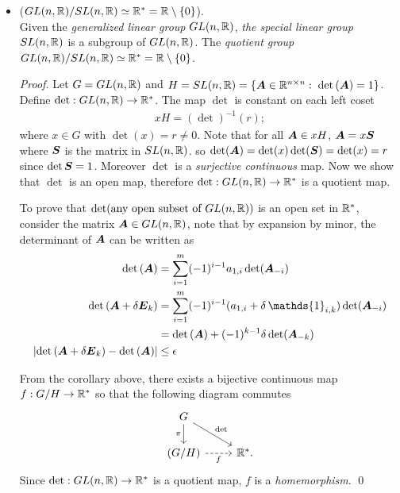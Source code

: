 \documentclass[11pt]{article}
\begin{document}
\begin{itemize}
\item \begin{example} ($GL(n, {\mathbb R})/SL(n, {\mathbb R}) \simeq {\mathbb R}^{*} = {\mathbb R} \setminus \left\{0\right\}$).\\
Given the \emph{generalized linear group} $GL(n, {\mathbb R})$, \emph{the special linear group} $SL(n, {\mathbb R})$ is a subgroup of $GL(n, {\mathbb R})$. The \emph{quotient group} $GL(n, {\mathbb R})/SL(n, {\mathbb R}) \simeq {\mathbb R}^{*} = {\mathbb R} \setminus \left\{0\right\}$.
\end{example}
\begin{proof}
Let $G = GL(n, {\mathbb R})$ and $H = SL(n, {\mathbb R}) = \left\{\boldsymbol{A}\in {\mathbb R}^{n\times n}:\; \det\left(\boldsymbol{A}\right)= 1\right\}$.  Define $\det: GL(n, {\mathbb R}) \rightarrow {\mathbb R}^{*}$. The map $\det$ is constant on each left coset 
\begin{align*}
xH = (\det{})^{-1}(r);
\end{align*} where $x \in G$ with $\det(x) = r \neq 0$. Note that for all $\boldsymbol{A} \in xH$, $\boldsymbol{A} = x\boldsymbol{S}$ where $\boldsymbol{S}$ is the matrix in $SL(n, {\mathbb R})$. so $\det(\boldsymbol{A}) = \det(x)\det(\boldsymbol{S}) = \det(x) = r$ since $\det{\boldsymbol{S}} = 1$.  Moreover $\det$ is a \emph{surjective continuous} map. Now we show that $\det$ is an open map, therefore $\det: GL(n, {\mathbb R}) \rightarrow {\mathbb R}^{*}$ is a quotient map.

To prove that $\det(\text{any open subset of }GL(n, {\mathbb R}))$ is an open set in ${\mathbb R}^{*}$, consider the matrix $\boldsymbol{A} \in GL(n, {\mathbb R})$, note that by expansion by minor, the determinant of $\boldsymbol{A}$ can be written as
\begin{align*}
\det\paren{\mb{A}} &= \sum_{i=1}^{m}(-1)^{i-1}a_{1,i}\det(\mb{A}_{-i})\\
\det\paren{\mb{A}+ \delta \mb{E}_{k}} &= \sum_{i=1}^{m}(-1)^{i-1}(a_{1,i} + \delta\,\mathds{1}_{i,k})\det(\mb{A}_{-i})\\
&= \det\paren{\mb{A}} + (-1)^{k-1} \delta\det(\mb{A}_{-k})\\
\abs{\det\paren{\mb{A}+ \delta \mb{E}_{k}} - \det\paren{\mb{A}}} &\le  \epsilon
\end{align*} 


From the corollary above, there exists a bijective continuous map $f: G/H \rightarrow {\mathbb R}^{*}$ so that the following diagram commutes
\[
  \begin{tikzcd}
     G  \arrow[swap]{d}{\pi} \arrow[dr, "\det"]  & \\
     (G/H)   \arrow[r, swap, dashed,  "f"]  & \bR^{*} .
  \end{tikzcd}
\]  Since $\det: GL(n, {\mathbb R}) \rightarrow {\mathbb R}^{*}$ is a quotient map, $f$ is a \emph{homemorphism}. \qed
\end{proof}


\end{itemize}
\end{document}
